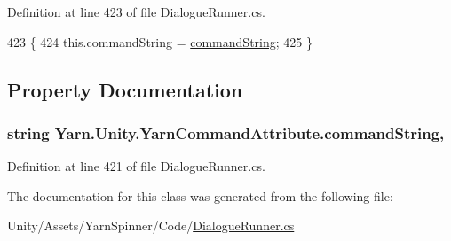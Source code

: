 Definition at line 423 of file Dialogue\-Runner.\-cs.


\begin{DoxyCode}
423                                                           \{
424             this.commandString = \hyperlink{a00187_a6d513a725c819ffcdaa9c5788472ec8d}{commandString};
425         \}
\end{DoxyCode}


\subsection{Property Documentation}
\hypertarget{a00187_a6d513a725c819ffcdaa9c5788472ec8d}{
\subsubsection[{command\-String}]{\setlength{\rightskip}{0pt plus 5cm}string Yarn.\-Unity.\-Yarn\-Command\-Attribute.\-command\-String\hspace{0.3cm}{\ttfamily [get]}, {\ttfamily [set]}}}\label{a00187_a6d513a725c819ffcdaa9c5788472ec8d}


Definition at line 421 of file Dialogue\-Runner.\-cs.



The documentation for this class was generated from the following file\-:\begin{DoxyCompactItemize}
\item 
Unity/\-Assets/\-Yarn\-Spinner/\-Code/\hyperlink{a00283}{Dialogue\-Runner.\-cs}\end{DoxyCompactItemize}
